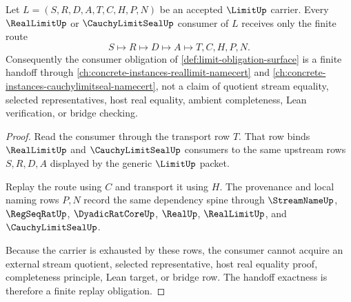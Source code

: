 \begin{theorem}
\label{thm:limit-consumer-handoff-exactness}
Let $L=(S,R,D,A,T,C,H,P,N)$ be an accepted $\LimitUp$ carrier. Every $\RealLimitUp$ or $\CauchyLimitSealUp$ consumer of $L$ receives only the finite route
$$
S \longmapsto R \longmapsto D \longmapsto A \longmapsto T,C,H,P,N .
$$
Consequently the consumer obligation of \autoref{def:limit-obligation-surface} is a finite handoff through \autoref{ch:concrete-instances-reallimit-namecert} and \autoref{ch:concrete-instances-cauchylimitseal-namecert}, not a claim of quotient stream equality, selected representatives, host real equality, ambient completeness, Lean verification, or bridge checking.
\end{theorem}
\begin{proof}
Read the consumer through the transport row $T$. That row binds $\RealLimitUp$ and $\CauchyLimitSealUp$ consumers to the same upstream rows $S,R,D,A$ displayed by the generic $\LimitUp$ packet.

Replay the route using $C$ and transport it using $H$. The provenance and local naming rows $P,N$ record the same dependency spine through $\StreamNameUp$, $\RegSeqRatUp$, $\DyadicRatCoreUp$, $\RealUp$, $\RealLimitUp$, and $\CauchyLimitSealUp$.

Because the carrier is exhausted by these rows, the consumer cannot acquire an external stream quotient, selected representative, host real equality proof, completeness principle, Lean target, or bridge row. The handoff exactness is therefore a finite replay obligation.
\end{proof}

